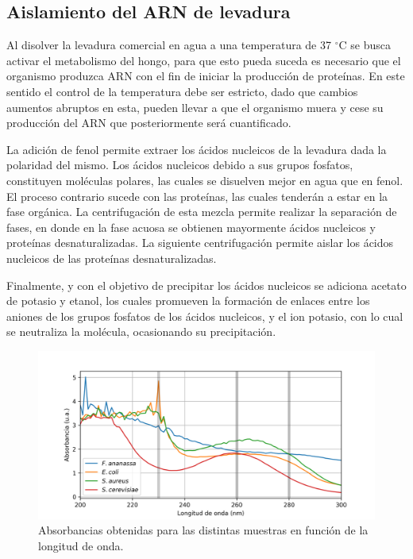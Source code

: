 \documentclass[fleqn,10pt]{SelfArx}
\begin{document}
	\subsection{Aislamiento del ARN de levadura}
		Al disolver la levadura comercial en agua a una temperatura de 37 $^\circ$C se busca activar el metabolismo del hongo, para que esto pueda suceda es necesario que el organismo produzca ARN con el fin de iniciar la producci\'on de prote\'inas. En este sentido el control de la temperatura debe ser estricto, dado que cambios aumentos abruptos en esta, pueden llevar a que el organismo muera y cese su producci\'on del ARN que posteriormente ser\'a cuantificado.
		
		La adici\'on de fenol permite extraer los \'acidos nucleicos de la levadura dada la polaridad del mismo. Los \'acidos nucleicos debido a sus grupos fosfatos, constituyen mol\'eculas polares, las cuales se disuelven mejor en agua que en fenol. El proceso contrario sucede con las prote\'inas, las cuales tender\'an a estar en la fase org\'anica. La centrifugaci\'on de esta mezcla permite realizar la separaci\'on de fases, en donde en la fase acuosa se obtienen mayormente \'acidos nucleicos y prote\'inas desnaturalizadas. La siguiente centrifugaci\'on permite aislar los \'acidos nucleicos de las prote\'inas desnaturalizadas.
		
		Finalmente, y con el objetivo de precipitar los \'acidos nucleicos se adiciona acetato de potasio y etanol, los cuales promueven la formaci\'on de enlaces entre los aniones de los grupos fosfatos de los \'acidos nucleicos, y el ion potasio, con lo cual se neutraliza la mol\'ecula, ocasionando su precipitaci\'on.
		
	\begin{figure}[h]
		\centering
		\includegraphics[width=\linewidth]{plots}
		\caption{Absorbancias obtenidas para las distintas muestras en funci\'on de la longitud de onda.}
		\label{fig}
	\end{figure}		
	
\end{document}

